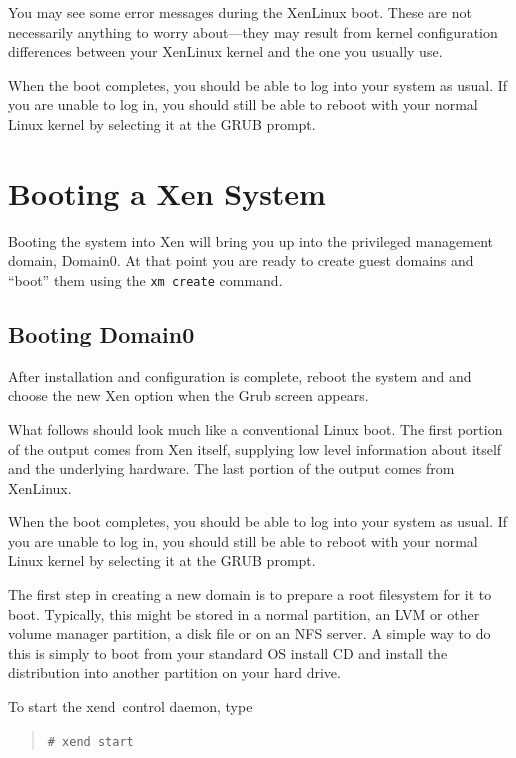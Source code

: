 \documentclass[11pt,twoside,final,openright]{report}
\def\xend{{xend}\xspace}
\begin{document}
You may see some error messages during the XenLinux boot. These are not
necessarily anything to worry about---they may result from kernel
configuration differences between your XenLinux kernel and the one you
usually use.

When the boot completes, you should be able to log into your system as
usual. If you are unable to log in, you should still be able to reboot
with your normal Linux kernel by selecting it at the GRUB prompt.


\chapter{Booting a Xen System}

Booting the system into Xen will bring you up into the privileged
management domain, Domain0. At that point you are ready to create
guest domains and ``boot'' them using the \texttt{xm create} command.

\section{Booting Domain0}

After installation and configuration is complete, reboot the system
and and choose the new Xen option when the Grub screen appears.

What follows should look much like a conventional Linux boot.  The
first portion of the output comes from Xen itself, supplying low level
information about itself and the underlying hardware.  The last
portion of the output comes from XenLinux.


When the boot completes, you should be able to log into your system as
usual.  If you are unable to log in, you should still be able to
reboot with your normal Linux kernel by selecting it at the GRUB prompt.

The first step in creating a new domain is to prepare a root
filesystem for it to boot.  Typically, this might be stored in a normal
partition, an LVM or other volume manager partition, a disk file or on
an NFS server.  A simple way to do this is simply to boot from your
standard OS install CD and install the distribution into another
partition on your hard drive.

To start the \xend\ control daemon, type
\begin{quote}
  \verb!# xend start!
\end{quote}
\end{document}
